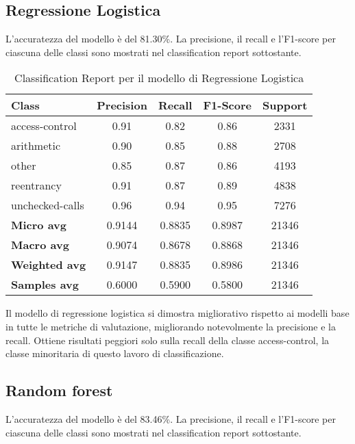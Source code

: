 \documentclass[../../Thesis.tex]{subfiles}
\begin{document}
\subsection{Regressione Logistica}
L'accuratezza del modello è del 81.30\%. La precisione, il recall e l'F1-score per ciascuna delle classi sono mostrati nel classification report sottostante.

\begin{table}[H]
    \centering
    \small
    \begin{tabular}{lcccc}
    \hline
    \textbf{Class} & \textbf{Precision} & \textbf{Recall} & \textbf{F1-Score} & \textbf{Support} \\
    \hline
    access-control & 0.91 & 0.82 & 0.86 & 2331 \\
    arithmetic & 0.90 & 0.85 & 0.88 & 2708 \\
    other & 0.85 & 0.87 & 0.86 & 4193 \\
    reentrancy & 0.91 & 0.87 & 0.89 & 4838 \\
    unchecked-calls & 0.96 & 0.94 & 0.95 & 7276 \\
    \hline
    \textbf{Micro avg} & 0.9144 & 0.8835 & 0.8987 & 21346 \\
    \textbf{Macro avg} & 0.9074 & 0.8678 & 0.8868 & 21346 \\
    \textbf{Weighted avg} & 0.9147 & 0.8835 & 0.8986 & 21346 \\
    \textbf{Samples avg} & 0.6000 & 0.5900 & 0.5800 & 21346 \\
    \hline
    \end{tabular}
    \caption{Classification Report per il modello di Regressione Logistica}
\end{table}
Il modello di regressione logistica si dimostra migliorativo rispetto ai modelli base in tutte le metriche di valutazione, migliorando notevolmente la precisione e la recall. Ottiene risultati peggiori solo sulla recall della classe access-control, la classe minoritaria di questo lavoro di classificazione.\\

\subsection{Random forest}
L'accuratezza del modello è del 83.46\%. La precisione, il recall e l'F1-score per ciascuna delle classi sono mostrati nel classification report sottostante.
\end{document}
